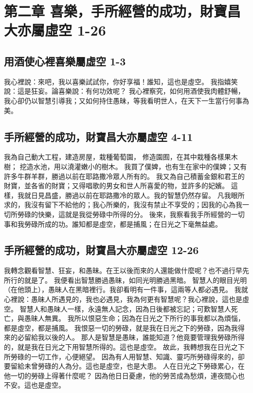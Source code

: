 \section{第二章 喜樂，手所經營的成功，財寶昌大亦屬虛空 1-26}
\subsection{用酒使心裡喜樂屬虛空 1-3}
我心裡說：來吧，我以喜樂試試你，你好享福！誰知，這也是虛空。
我指嬉笑說：這是狂妄。論喜樂說：有何功效呢？
我心裡察究，如何用酒使我肉體舒暢，我心卻仍以智慧引導我；又如何持住愚昧，等我看明世人，在天下一生當行何事為美。

\subsection{手所經營的成功，財寶昌大亦屬虛空 4-11}
我為自己動大工程，建造房屋，栽種葡萄園，
修造園囿，在其中栽種各樣果木樹；
挖造水池，用以澆灌嫩小的樹木。
我買了僕婢，也有生在家中的僕婢；又有許多牛群羊群，勝過以前在耶路撒冷眾人所有的。
我又為自己積蓄金銀和君王的財寶，並各省的財寶；又得唱歌的男女和世人所喜愛的物，並許多的妃嬪。
這樣，我就日見昌盛，勝過以前在耶路撒冷的眾人。我的智慧仍然存留。
凡我眼所求的，我沒有留下不給他的；我心所樂的，我沒有禁止不享受的；因我的心為我一切所勞碌的快樂，這就是我從勞碌中所得的分。
後來，我察看我手所經營的一切事和我勞碌所成的功。誰知都是虛空，都是捕風；在日光之下毫無益處。

\subsection{手所經營的成功，財寶昌大亦屬虛空 12-26}
我轉念觀看智慧、狂妄，和愚昧。在王以後而來的人還能做什麼呢？也不過行早先所行的就是了。
我便看出智慧勝過愚昧，如同光明勝過黑暗。
智慧人的眼目光明（在他頭上），愚昧人在黑暗裡行。我卻看明有一件事，這兩等人都必遇見。
我就心裡說：愚昧人所遇見的，我也必遇見，我為何更有智慧呢？我心裡說，這也是虛空。
智慧人和愚昧人一樣，永遠無人記念，因為日後都被忘記；可歎智慧人死亡，與愚昧人無異。
我所以恨惡生命；因為在日光之下所行的事我都以為煩惱，都是虛空，都是捕風。
我恨惡一切的勞碌，就是我在日光之下的勞碌，因為我得來的必留給我以後的人。
那人是智慧是愚昧，誰能知道？他竟要管理我勞碌所得的，就是我在日光之下用智慧所得的。這也是虛空。
故此，我轉想我在日光之下所勞碌的一切工作，心便絕望。
因為有人用智慧、知識、靈巧所勞碌得來的，卻要留給未曾勞碌的人為分。這也是虛空，也是大患。
人在日光之下勞碌累心，在他一切的勞碌上得著什麼呢？
因為他日日憂慮，他的勞苦成為愁煩，連夜間心也不安。這也是虛空。

